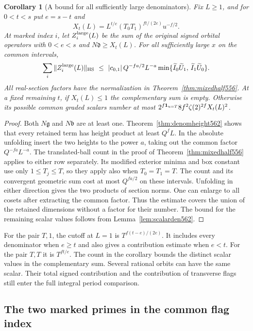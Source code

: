\documentclass[a4paper,11pt]{article}
\newtheorem{corollary}[proposition]{Corollary}
\theoremstyle{definition}
\theoremstyle{remark}
\numberwithin{equation}{section}
\begin{document}
\begin{corollary}[A bound for all sufficiently large denominators]
\leavevmode\label{cor:denomperiod562}
Fix \(L\ge1\), and for \(0<t<s\) put \(e=s-t\) and
\[
   X_t(L)=L^{t/e}(T_0T_1)^{ft/(2e)}u^{-f/2}.
\]
At marked index \(i\), let \(Z_i^{\rm large}(L)\) be the
sum of the original signed orbital operators with
\(0<e<s\) and \(N\mathfrak d\ge X_t(L)\). For all sufficiently
large \(x\) on the common intervals,
\[
 \sum_i\|Z_i^{\rm large}(L)\|_{\rm HS}
     \ \le\ |c_{0,1}|\,Q^{-fa/2}L^{-a}
       \min\{\widetilde I_0\widetilde U_1,\,
                          \widetilde I_1\widetilde U_0\}.
\]
All real-section factors have the normalization in
Theorem~\ref{thm:mixedhalf556}. At a fixed remaining \(t\),
if \(X_t(L)\le1\) the complementary sum is empty. Otherwise
its possible common graded scalars number at most
\(2^{f{\bf1}_{u=T}}8f^2\zeta(2)^{2f}X_t(L)^2\).
\end{corollary}
\begin{proof}
Both \(N\mathfrak g\) and \(N\mathfrak b\) are at least one.
Theorem~\ref{thm:denomheight562} shows that every retained term
has height product at least \(Q^f L\). In the absolute
unfolding insert the two heights to the power \(a\), taking out
the common factor \(Q^{-fa}L^{-a}\). The translated-ball
count in the proof of Theorem~\ref{thm:mixedhalf556} applies
to either row separately. Its modified exterior minima and
box constant use only \(1\le T_j\le T\), so they apply also
when \(T_0=T_1=T\). The count and its convergent geometric
sum cost at most \(Q^{fa/2}\) on these intervals. Unfolding in
either direction gives the two products of section norms.
One can enlarge to all cosets after extracting the common
factor. Thus the estimate covers the union of the retained
dimensions without a factor for their number. The bound for
the remaining scalar values follows from Lemma~\ref{lem:scalarden562}.
\end{proof}

For the pair \(T,1\), the cutoff at \(L=1\) is
\(T^{f(t-e)/(2e)}\). It includes every denominator when
\(e\ge t\) and also gives a contribution estimate when \(e<t\).
For the pair \(T,T\) it is \(T^{ft/e}\). The count in the
corollary bounds the distinct scalar values in the complementary
sum. Several rational orbits can have the same scalar. Their
total signed contribution and the contribution of transverse
flags still enter the full integral period comparison.


\subsection{The two marked primes in the common flag index}
\label{sec:markedindex564}
\end{document}
